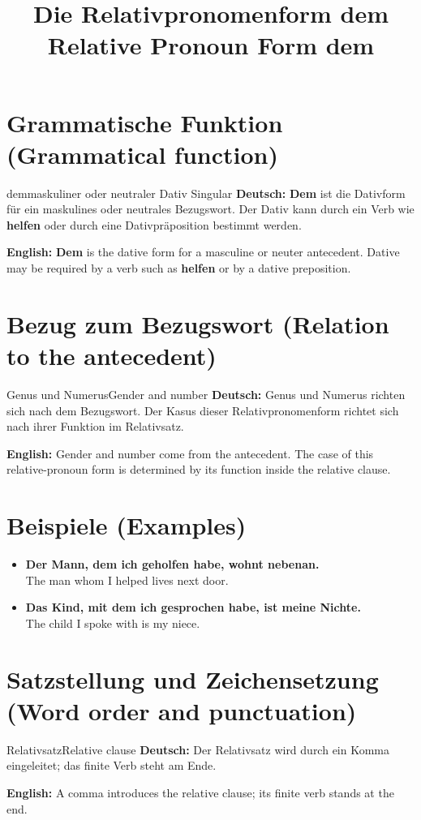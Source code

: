 \documentclass[a4paper,11pt]{article}
\title{Die Relativpronomenform \glqq dem\grqq{}\\\large Relative Pronoun Form \glqq dem\grqq{}}
\date{}
\newcommand{\GermanText}[1]{\textbf{Deutsch: }#1\par}
\newcommand{\EnglishText}[1]{{\small\color{SoftGray}\textbf{English: }#1\par}}
\newcommand{\ExampleItem}[2]{\item \textbf{#1}\\{\small\color{SoftGray}#2}}
\begin{document}
\maketitle
\tableofcontents
\newpage
\section{Grammatische Funktion (Grammatical function)}
\begin{grammarentry}{dem}{maskuliner oder neutraler Dativ Singular}
\GermanText{\textbf{Dem} ist die Dativform für ein maskulines oder neutrales Bezugswort. Der Dativ kann durch ein Verb wie \textbf{helfen} oder durch eine Dativpräposition bestimmt werden.}
\EnglishText{\textbf{Dem} is the dative form for a masculine or neuter antecedent. Dative may be required by a verb such as \textbf{helfen} or by a dative preposition.}
\end{grammarentry}
\section{Bezug zum Bezugswort (Relation to the antecedent)}
\begin{grammarentry}{Genus und Numerus}{Gender and number}
\GermanText{Genus und Numerus richten sich nach dem Bezugswort. Der Kasus dieser Relativpronomenform richtet sich nach ihrer Funktion im Relativsatz.}
\EnglishText{Gender and number come from the antecedent. The case of this relative-pronoun form is determined by its function inside the relative clause.}
\end{grammarentry}
\section{Beispiele (Examples)}
\begin{exbox}\begin{itemize}
\ExampleItem{Der Mann, dem ich geholfen habe, wohnt nebenan.}{The man whom I helped lives next door.}
\ExampleItem{Das Kind, mit dem ich gesprochen habe, ist meine Nichte.}{The child I spoke with is my niece.}
\end{itemize}\end{exbox}
\section{Satzstellung und Zeichensetzung (Word order and punctuation)}
\begin{grammarentry}{Relativsatz}{Relative clause}
\GermanText{Der Relativsatz wird durch ein Komma eingeleitet; das finite Verb steht am Ende.}
\EnglishText{A comma introduces the relative clause; its finite verb stands at the end.}
\end{grammarentry}
\end{document}
